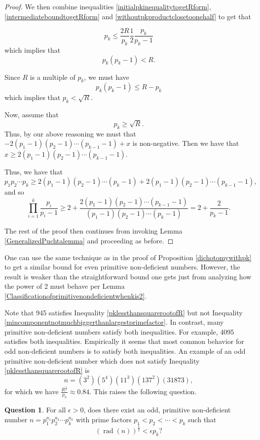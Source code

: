 \documentclass[12pt,reqno]{article}
\theoremstyle{plain}
\theoremstyle{definition}
\newtheorem{question}[theorem]{Question}
\theoremstyle{remark}
\DeclareMathOperator{\rad}{rad}
\begin{document}
\begin{proof}
We then combine inequalities \eqref{initialpkinequalitytogetRform}, \eqref{intermediateboundtogetRform} and \eqref{withoutpkproductclosetoonehalf} to get that

$$p_k \leq \frac{2R}{p_k}\frac{1}{2}\frac{p_k}{p_k-1}$$ which implies that
\begin{equation}p_k (p_k-1) < R.\label{pktimespkminus1lessthanR}\end{equation}

Since $R$ is a multiple of $p_k$, we must have $$p_k(p_k-1) \leq R-p_k$$ which implies that $p_k < \sqrt{R}$.

Now, assume that $$p_k \geq  \sqrt{R}.$$ Thus, by our above reasoning we must that $-2(p_1-1)(p_2-1)\cdots(p_{k-1}-1) + x$  is non-negative. Then we have that $x \geq 2(p_1-1)(p_2-1)\cdots(p_{k-1}-1)$.

Thus, we have that
\begin{equation}p_1p_2 \cdots p_k  \geq  2(p_1-1)(p_2-1)\cdots (p_k-1) + 2(p_1-1)(p_2-1)\cdots(p_{k-1}-1) \label{Wegettousex},\end{equation}
and so
$$\prod_{i=1}^k \frac{p_i}{p_i-1} \geq 2 +\frac{2(p_1-1)(p_2-1)\cdots(p_{k-1}-1)}{(p_1-1)(p_2-1)\cdots(p_k-1)} =  2 + \frac{2}{p_k-1}.   $$

The rest of the proof then continues from invoking Lemma \ref{GeneralizedPuchtalemma} and proceeding as before. 
\end{proof}

One can use the same technique as in the proof of Proposition \ref{dichotomywithpk} to get a similar bound for even primitive non-deficient numbers. However, the result is weaker than the straightforward bound one gets just from analyzing how the power of 2 must behave per Lemma \ref{Classificationofprimitivenondeficientwhenkis2}.

Note that 945 satisfies Inequality \eqref{pklessthansquarerootofR} but not Inequality \eqref{mincomponentnotmuchbiggerthanlargestprimefactor}. In contrast, many primitive non-deficient numbers satisfy both inequalities. For example, 4095 satisfies both inequalities. Empirically it seems that most common behavior for odd non-deficient numbers is to satisfy both inequalities. An example of an odd primitive non-deficient number which does not satisfy Inequality  \eqref{pklessthansquarerootofR} is $$n = (3^2)(5^4)(11^3)(137^2)(31873),$$ for which we have $\frac{R^{\frac{1}{2}}}{p_k} \approx 0.84$. This raises the following question.

\begin{question} For all $\epsilon>0$, does there exist an odd, primitive non-deficient number $n=p_1^{a_1}p_2^{a_2} \cdots p_k^{a_k}$ with prime factors $p_1 < p_2 < \cdots < p_k$ such that
$$(\rad(n))^{\frac{1}{2}} < \epsilon p_k?$$  \label{questionaboutradicalandpk}
\end{question}
\end{document}
